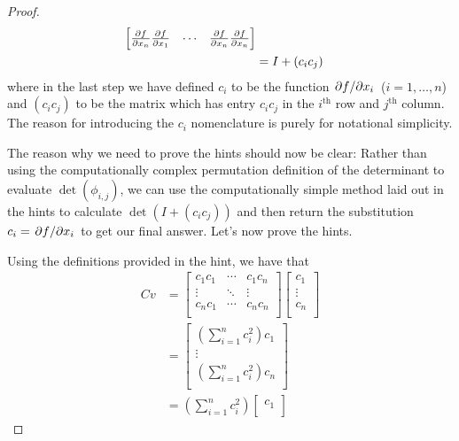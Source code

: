 \documentclass[../psets.tex]{subfiles}
\begin{document}
\begin{enumerate}[label={\textbf{4.4.\roman*.}}]
\begin{proof}
\begin{align*}
\begin{bmatrix}
                \pdv{f}{x_n}\pdv{f}{x_1} & \cdots & \pdv{f}{x_n}\pdv{f}{x_n}\\
            \end{bmatrix}\\
            &= I+(c_ic_j)
        \end{align*}
        where in the last step we have defined $c_i$ to be the function $\pdv*{f}{x_i}$ ($i=1,\dots,n$) and $(c_ic_j)$ to be the matrix which has entry $c_ic_j$ in the $i^\text{th}$ row and $j^\text{th}$ column. The reason for introducing the $c_i$ nomenclature is purely for notational simplicity.\par\smallskip
        The reason why we need to prove the hints should now be clear: Rather than using the computationally complex permutation definition of the determinant to evaluate $\det(\phi_{i,j})$, we can use the computationally simple method laid out in the hints to calculate $\det(I+(c_ic_j))$ and then return the substitution $c_i=\pdv*{f}{x_i}$ to get our final answer. Let's now prove the hints.\par
        Using the definitions provided in the hint, we have that
        \begin{align*}
            Cv &=
            \begin{bmatrix}
                c_1c_1 & \cdots & c_1c_n\\
                \vdots & \ddots & \vdots\\
                c_nc_1 & \cdots & c_nc_n\\
            \end{bmatrix}
            \begin{bmatrix}
                c_1\\
                \vdots\\
                c_n\\
            \end{bmatrix}\\
            &=
            \begin{bmatrix}
                \left( \sum_{i=1}^nc_i^2  \right)c_1\\
                \vdots\\
                \left( \sum_{i=1}^nc_i^2  \right)c_n\\
            \end{bmatrix}\\
            &= \left( \sum_{i=1}^nc_i^2  \right)
            \begin{bmatrix}
                c_1\\

\end{bmatrix}
\end{align*}
\end{proof}
\end{enumerate}
\end{document}
